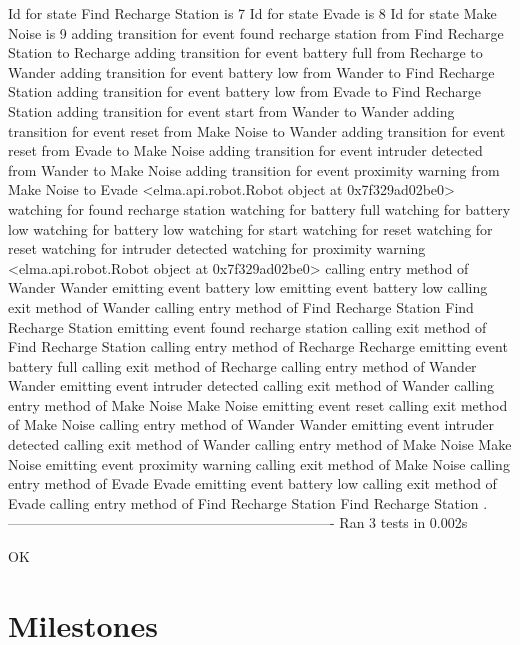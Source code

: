 \begin{DoxyEnumerate}
\begin{DoxyCode}
Id for state Find Recharge Station is 7
Id for state Evade is 8
Id for state Make Noise is 9
adding transition for event found recharge station from Find Recharge Station to Recharge
adding transition for event battery full from Recharge to Wander
adding transition for event battery low from Wander to Find Recharge Station
adding transition for event battery low from Evade to Find Recharge Station
adding transition for event start from Wander to Wander
adding transition for event reset from Make Noise to Wander
adding transition for event reset from Evade to Make Noise
adding transition for event intruder detected from Wander to Make Noise
adding transition for event proximity warning from Make Noise to Evade
<elma.api.robot.Robot object at 0x7f329ad02be0>
watching for found recharge station
watching for battery full
watching for battery low
watching for battery low
watching for start
watching for reset
watching for reset
watching for intruder detected
watching for proximity warning
<elma.api.robot.Robot object at 0x7f329ad02be0>
calling entry method of Wander
Wander
emitting event battery low
emitting event battery low
calling exit method of Wander
calling entry method of Find Recharge Station
Find Recharge Station
emitting event found recharge station
calling exit method of Find Recharge Station
calling entry method of Recharge
Recharge
emitting event battery full
calling exit method of Recharge
calling entry method of Wander
Wander
emitting event intruder detected
calling exit method of Wander
calling entry method of Make Noise
Make Noise
emitting event reset
calling exit method of Make Noise
calling entry method of Wander
Wander
emitting event intruder detected
calling exit method of Wander
calling entry method of Make Noise
Make Noise
emitting event proximity warning
calling exit method of Make Noise
calling entry method of Evade
Evade
emitting event battery low
calling exit method of Evade
calling entry method of Find Recharge Station
Find Recharge Station
.
----------------------------------------------------------------------
Ran 3 tests in 0.002s

OK
\end{DoxyCode}

\end{DoxyEnumerate}

\section*{Milestones}

